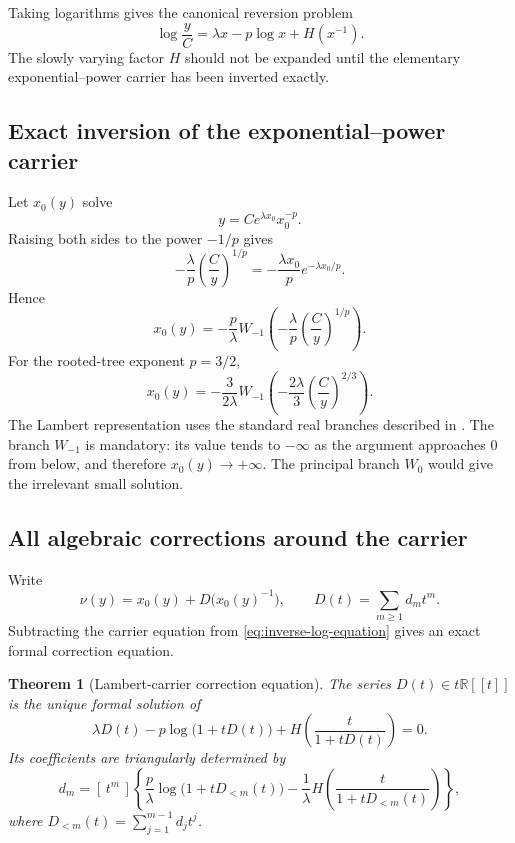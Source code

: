 \documentclass[11pt,oneside]{article}
\numberwithin{equation}{section}
\theoremstyle{plain}
\newtheorem{theorem}{Theorem}[section]
\theoremstyle{definition}
\theoremstyle{remark}
\newcommand{\R}{\mathbb R}
\newcommand{\Coeff}[2]{[\,#1^{#2}\,]}
\begin{document}
Taking logarithms gives the canonical reversion problem
\begin{equation}\label{eq:inverse-log-equation}
 \log\frac yC=\lambda x-p\log x+H(x^{-1}).
\end{equation}
The slowly varying factor $H$ should not be expanded until the elementary
exponential--power carrier has been inverted exactly.

\subsection{Exact inversion of the exponential--power carrier}

Let $x_0(y)$ solve
\begin{equation}\label{eq:carrier-equation}
 y=C e^{\lambda x_0}x_0^{-p}.
\end{equation}
Raising both sides to the power $-1/p$ gives
\[
 -\frac{\lambda}{p}\left(\frac Cy\right)^{1/p}
 =-\frac{\lambda x_0}{p}e^{-\lambda x_0/p}.
\]
Hence
\begin{equation}\label{eq:carrier-W-general}
 \boxed{
 x_0(y)=-\frac p\lambda
 W_{-1}\!\left(-\frac\lambda p\left(\frac Cy\right)^{1/p}\right).}
\end{equation}
For the rooted-tree exponent $p=3/2$,
\begin{equation}\label{eq:carrier-W-tree}
 \boxed{
 x_0(y)=-\frac{3}{2\lambda}
 W_{-1}\!\left(-\frac{2\lambda}{3}
 \left(\frac Cy\right)^{2/3}\right).}
\end{equation}
The Lambert representation uses the standard real branches described in
\cite{Corless1996}.  The branch $W_{-1}$ is mandatory: its value tends to $-\infty$ as the
argument approaches $0$ from below, and therefore $x_0(y)\to+\infty$.
The principal branch $W_0$ would give the irrelevant small solution.

\subsection{All algebraic corrections around the carrier}

Write
\begin{equation}\label{eq:D-ansatz}
 \nu(y)=x_0(y)+D\bigl(x_0(y)^{-1}\bigr),\qquad
 D(t)=\sum_{m\ge1}d_mt^m.
\end{equation}
Subtracting the carrier equation from \eqref{eq:inverse-log-equation} gives
an exact formal correction equation.

\begin{theorem}[Lambert-carrier correction equation]\label{thm:D-equation}
The series $D(t)\in t\R[[t]]$ is the unique formal solution of
\begin{equation}\label{eq:D-equation}
 \boxed{
 \lambda D(t)-p\log\bigl(1+tD(t)\bigr)
 +H\!\left(\frac{t}{1+tD(t)}\right)=0.}
\end{equation}
Its coefficients are triangularly determined by
\begin{equation}\label{eq:d-coeff-extraction}
 \boxed{
 d_m=\Coeff{t}{m}\left\{
 \frac p\lambda\log\bigl(1+tD_{<m}(t)\bigr)
 -\frac1\lambda H\!\left(
 \frac{t}{1+tD_{<m}(t)}\right)\right\},}
\end{equation}
where $D_{<m}(t)=\sum_{j=1}^{m-1}d_jt^j$.
\end{theorem}
\end{document}
